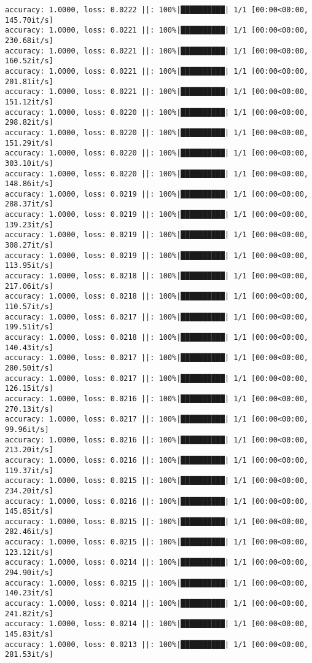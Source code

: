 \documentclass[
]{article}
\begin{document}
\begin{verbatim}
accuracy: 1.0000, loss: 0.0222 ||: 100%|██████████| 1/1 [00:00<00:00, 145.70it/s]
accuracy: 1.0000, loss: 0.0221 ||: 100%|██████████| 1/1 [00:00<00:00, 230.68it/s]
accuracy: 1.0000, loss: 0.0221 ||: 100%|██████████| 1/1 [00:00<00:00, 160.52it/s]
accuracy: 1.0000, loss: 0.0221 ||: 100%|██████████| 1/1 [00:00<00:00, 201.81it/s]
accuracy: 1.0000, loss: 0.0221 ||: 100%|██████████| 1/1 [00:00<00:00, 151.12it/s]
accuracy: 1.0000, loss: 0.0220 ||: 100%|██████████| 1/1 [00:00<00:00, 298.82it/s]
accuracy: 1.0000, loss: 0.0220 ||: 100%|██████████| 1/1 [00:00<00:00, 151.29it/s]
accuracy: 1.0000, loss: 0.0220 ||: 100%|██████████| 1/1 [00:00<00:00, 303.10it/s]
accuracy: 1.0000, loss: 0.0220 ||: 100%|██████████| 1/1 [00:00<00:00, 148.86it/s]
accuracy: 1.0000, loss: 0.0219 ||: 100%|██████████| 1/1 [00:00<00:00, 288.37it/s]
accuracy: 1.0000, loss: 0.0219 ||: 100%|██████████| 1/1 [00:00<00:00, 139.23it/s]
accuracy: 1.0000, loss: 0.0219 ||: 100%|██████████| 1/1 [00:00<00:00, 308.27it/s]
accuracy: 1.0000, loss: 0.0219 ||: 100%|██████████| 1/1 [00:00<00:00, 113.95it/s]
accuracy: 1.0000, loss: 0.0218 ||: 100%|██████████| 1/1 [00:00<00:00, 217.06it/s]
accuracy: 1.0000, loss: 0.0218 ||: 100%|██████████| 1/1 [00:00<00:00, 110.57it/s]
accuracy: 1.0000, loss: 0.0217 ||: 100%|██████████| 1/1 [00:00<00:00, 199.51it/s]
accuracy: 1.0000, loss: 0.0218 ||: 100%|██████████| 1/1 [00:00<00:00, 140.43it/s]
accuracy: 1.0000, loss: 0.0217 ||: 100%|██████████| 1/1 [00:00<00:00, 280.50it/s]
accuracy: 1.0000, loss: 0.0217 ||: 100%|██████████| 1/1 [00:00<00:00, 126.15it/s]
accuracy: 1.0000, loss: 0.0216 ||: 100%|██████████| 1/1 [00:00<00:00, 270.13it/s]
accuracy: 1.0000, loss: 0.0217 ||: 100%|██████████| 1/1 [00:00<00:00, 99.96it/s]
accuracy: 1.0000, loss: 0.0216 ||: 100%|██████████| 1/1 [00:00<00:00, 213.20it/s]
accuracy: 1.0000, loss: 0.0216 ||: 100%|██████████| 1/1 [00:00<00:00, 119.37it/s]
accuracy: 1.0000, loss: 0.0215 ||: 100%|██████████| 1/1 [00:00<00:00, 234.20it/s]
accuracy: 1.0000, loss: 0.0216 ||: 100%|██████████| 1/1 [00:00<00:00, 145.85it/s]
accuracy: 1.0000, loss: 0.0215 ||: 100%|██████████| 1/1 [00:00<00:00, 282.46it/s]
accuracy: 1.0000, loss: 0.0215 ||: 100%|██████████| 1/1 [00:00<00:00, 123.12it/s]
accuracy: 1.0000, loss: 0.0214 ||: 100%|██████████| 1/1 [00:00<00:00, 294.90it/s]
accuracy: 1.0000, loss: 0.0215 ||: 100%|██████████| 1/1 [00:00<00:00, 140.23it/s]
accuracy: 1.0000, loss: 0.0214 ||: 100%|██████████| 1/1 [00:00<00:00, 241.82it/s]
accuracy: 1.0000, loss: 0.0214 ||: 100%|██████████| 1/1 [00:00<00:00, 145.83it/s]
accuracy: 1.0000, loss: 0.0213 ||: 100%|██████████| 1/1 [00:00<00:00, 281.53it/s]

\end{verbatim}
\end{document}
